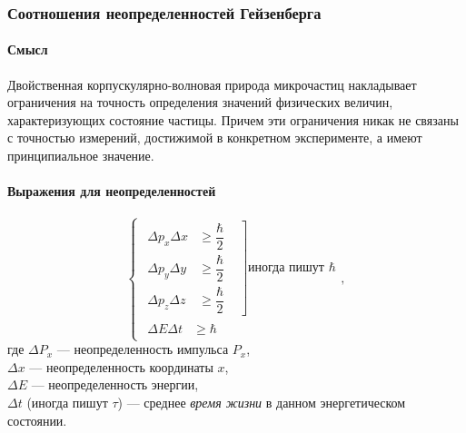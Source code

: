 \subsubsection{Соотношения неопределенностей Гейзенберга}
\begin{multicols}{2}
	\paragraph{Смысл}
	Двойственная корпускулярно-волновая природа микрочастиц накладывает ограничения на точность определения значений физических величин, характеризующих состояние частицы. Причем эти ограничения никак не связаны с точностью измерений, достижимой в конкретном эксперименте, а имеют принципиальное значение.
	\paragraph{Выражения для неопределенностей}
	\begin{equation*}
		\begin{cases}
		\left.\begin{array}{lll}
			\Delta p_x \Delta x & \geq \dfrac{\hbar}{2} &  \\[10pt]
			\Delta p_y \Delta y & \geq \dfrac{\hbar}{2} &  \\[10pt]
			\Delta p_z \Delta z & \geq \dfrac{\hbar}{2} &  
		\end{array}\right] \text{иногда пишут $\hbar$} \\[1.5cm]
		\begin{array}{rr}
			\Delta E \Delta t  & \geq \hbar 
		\end{array}
		\end{cases},
	\end{equation*}где $\Delta P_{x}$ --- неопределенность импульса $P_{x}$, \\
	$\Delta x$ --- неопределенность координаты $x$,\\
	$\Delta E$ --- неопределенность энергии,\\
	$\Delta t$ (иногда пишут $\tau$) --- среднее \textit{время жизни} в данном энергетическом состоянии.
	

\end{multicols}
